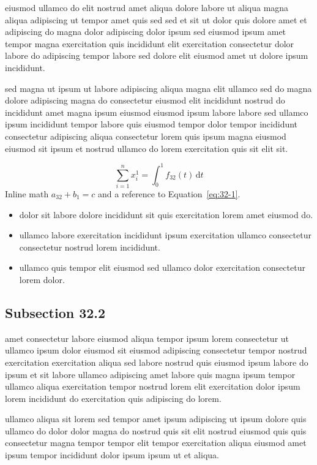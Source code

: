 \documentclass{article}
\begin{document}
eiusmod ullamco do elit nostrud amet aliqua dolore labore ut aliqua magna aliqua adipiscing ut tempor amet quis sed sed et sit ut dolor quis dolore amet et adipiscing do magna dolor adipiscing dolor ipsum sed eiusmod ipsum amet tempor magna exercitation quis incididunt elit exercitation consectetur dolor labore do adipiscing tempor labore sed dolore elit eiusmod amet ut dolore ipsum incididunt.

sed magna ut ipsum ut labore adipiscing aliqua magna elit ullamco sed do magna dolore adipiscing magna do consectetur eiusmod elit incididunt nostrud do incididunt amet magna ipsum eiusmod eiusmod ipsum labore labore sed ullamco ipsum incididunt tempor labore quis eiusmod tempor dolor tempor incididunt consectetur adipiscing aliqua consectetur lorem quis ipsum magna eiusmod eiusmod sit ipsum et nostrud ullamco do lorem exercitation quis sit elit sit.

\begin{equation}\label{eq:32-1}
  \sum_{i=1}^{n} x_i^{1} = \int_0^1 f_{32}(t)\,\mathrm{d}t
\end{equation}
Inline math $a_{32} + b_{1} = c$ and a reference to Equation~\eqref{eq:32-1}.

\begin{itemize}
  \item dolor sit labore dolore incididunt sit quis exercitation lorem amet eiusmod do.
  \item ullamco labore exercitation incididunt ipsum exercitation ullamco consectetur consectetur nostrud lorem incididunt.
  \item ullamco quis tempor elit eiusmod sed ullamco dolor exercitation consectetur lorem dolor.
\end{itemize}

\subsection{Subsection 32.2}\label{sec:32-2}
amet consectetur labore eiusmod aliqua tempor ipsum lorem consectetur ut ullamco ipsum dolor eiusmod sit eiusmod adipiscing consectetur tempor nostrud exercitation exercitation aliqua sed labore nostrud quis eiusmod ipsum labore do ipsum et sit labore ullamco adipiscing amet labore quis magna ipsum tempor ullamco aliqua exercitation tempor nostrud lorem elit exercitation dolor ipsum lorem incididunt do exercitation quis adipiscing do lorem.

ullamco aliqua sit lorem sed tempor amet ipsum adipiscing ut ipsum dolore quis ullamco do dolor dolor magna do nostrud quis sit elit nostrud eiusmod quis quis consectetur magna tempor tempor elit tempor exercitation aliqua eiusmod amet ipsum tempor incididunt dolor ipsum ipsum ut et aliqua.
\end{document}
